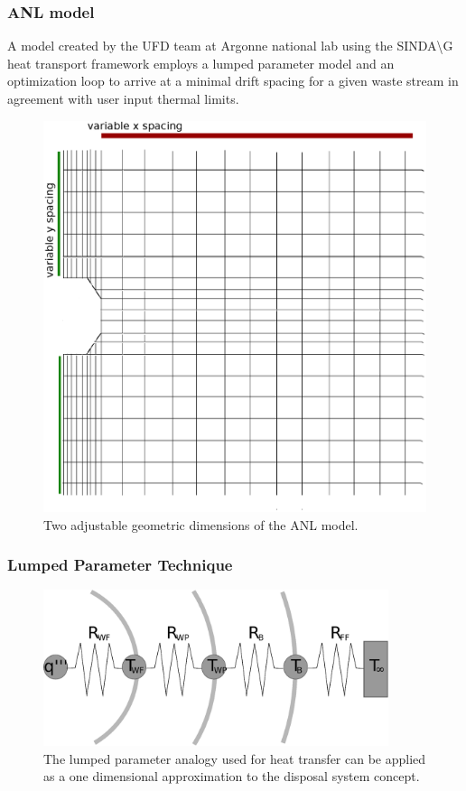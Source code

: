 \begin{frame}
  \frametitle{ANL model}
  A model created by the UFD team at Argonne national lab using the 
  SINDA{\textbackslash}G heat transport framework employs a lumped parameter 
  model and an optimization loop to arrive at a minimal drift spacing for a 
  given waste stream in agreement with user input thermal limits. 
  \begin{figure}[h!]
    \begin{center}
      \includegraphics[height=.5\textheight]{sindageom.eps}
    \end{center}
    \caption{Two adjustable geometric dimensions of the ANL model.} 
    \label{fig:sindageom}
  \end{figure}
\end{frame}


\begin{frame}[ctb!]
  \frametitle{Lumped Parameter Technique}
  \begin{figure}[h!]
    \begin{center}
      \includegraphics[width=0.9\textwidth]{lumpedParam.eps}
    \end{center}
    \caption{The lumped parameter analogy used for heat transfer can be applied 
    as a one dimensional approximation to the disposal system concept. }
    \label{fig:lumpedParam}
  \end{figure}
\end{frame}


